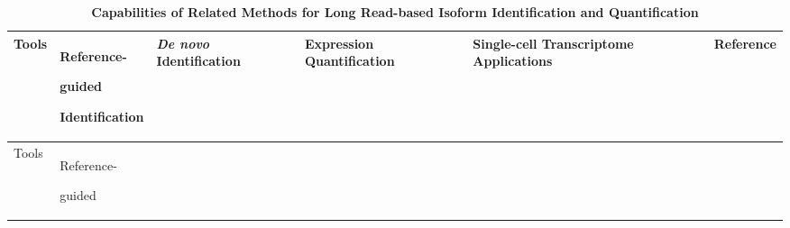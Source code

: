 \begin{longtable}[]{@{}
  >{\raggedright\arraybackslash}p{}
  >{\raggedright\arraybackslash}p{}
  >{\raggedright\arraybackslash}p{}
  >{\raggedright\arraybackslash}p{}
  >{\raggedright\arraybackslash}p{}
  >{\raggedright\arraybackslash}p{}@{}}
\caption{\textbf{Capabilities of Related Methods for Long Read-based Isoform Identification and Quantification}}\label{tab:1}\tabularnewline
\toprule\noalign{}
\begin{minipage}[b]{\linewidth}\centering
Tools
\end{minipage} & \begin{minipage}[b]{\linewidth}\centering
Reference-

guided

Identification
\end{minipage} & \begin{minipage}[b]{\linewidth}\centering
\emph{De novo} Identification
\end{minipage} & \begin{minipage}[b]{\linewidth}\centering
Expression Quantification
\end{minipage} & \begin{minipage}[b]{\linewidth}\centering
Single-cell Transcriptome Applications
\end{minipage} & \begin{minipage}[b]{\linewidth}\centering
Reference
\end{minipage} \\
\midrule\noalign{}
\endfirsthead
\toprule\noalign{}
\begin{minipage}[b]{\linewidth}\centering
Tools
\end{minipage} & \begin{minipage}[b]{\linewidth}\centering
Reference-

guided


\end{minipage}
\end{longtable}
